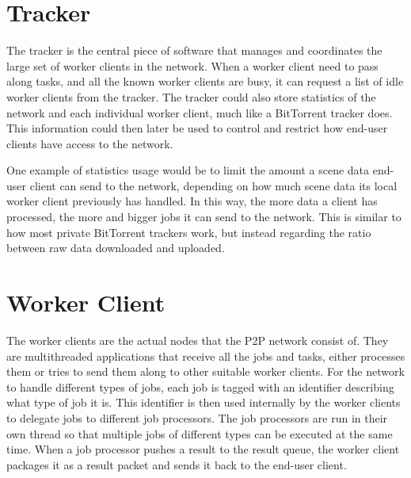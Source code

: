 \section{Tracker}
The tracker is the central piece of software that manages and coordinates the large set of worker clients in the network.
When a worker client need to pass along tasks, and all the known worker clients are busy, it can request a list of idle worker clients from the tracker. The tracker could also store statistics of the network and each individual worker client, much like a BitTorrent tracker does. This information could then later be used to control and restrict how end-user clients have access to the network. 

One example of statistics usage would be to limit the amount a scene data end-user client can send to the network, depending on how much scene data its local worker client previously has handled. In this way, the more data a client has processed, the more and bigger jobs it can send to the network. This is similar to how most private BitTorrent trackers work, but instead regarding the ratio between raw data downloaded and uploaded.



\section{Worker Client}
The worker clients are the actual nodes that the P2P network consist of. They are multithreaded  applications that receive all the jobs and tasks, either processes them or tries to send them along to other suitable worker clients. For the network to handle different types of jobs, each job is tagged with an identifier describing what type of job it is. This identifier is then used internally by the worker clients to delegate jobs to different job processors. The job processors are run in their own thread so that multiple jobs of different types can be executed at the same time. When a job processor pushes a result to the result queue, the worker client packages it as a result packet and sends it back to the end-user client.

